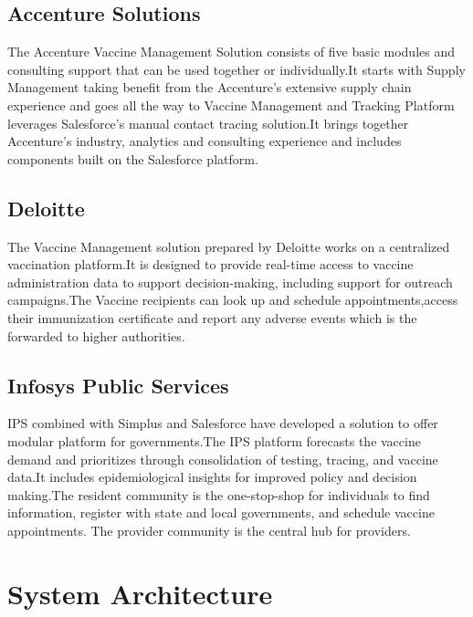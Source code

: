 \documentclass[10pt,twocolumn,letterpaper]{article}
\begin{document}
\subsection{Accenture Solutions }

The Accenture Vaccine Management Solution consists of five basic modules and consulting support that can be used together or individually.It starts with Supply Management taking benefit from the Accenture's extensive supply chain experience and goes all the way to Vaccine Management and Tracking Platform leverages Salesforce’s manual contact tracing solution.It brings together Accenture’s industry, analytics and consulting experience and includes components built on the Salesforce platform.~\cite{Accenture}

\subsection{Deloitte}
The Vaccine Management solution prepared by Deloitte works on a centralized vaccination platform.It is designed to provide real-time access to vaccine administration data to support decision-making, including support for outreach campaigns.The Vaccine recipients can look up and schedule appointments,access their immunization certificate and report any adverse events which is the forwarded to higher authorities.~\cite{Delloitte}
\subsection{Infosys Public Services}
IPS combined with Simplus and Salesforce have developed a solution to offer modular platform for governments.The IPS platform forecasts the vaccine demand and prioritizes through consolidation of testing, tracing, and vaccine data.It includes epidemiological insights for improved policy and decision making.The resident community is the one-stop-shop for individuals to find information, register with state and local governments, and schedule vaccine appointments. The provider community is the central hub for providers. ~\cite{Infosys}
\section{System Architecture}
\end{document}
